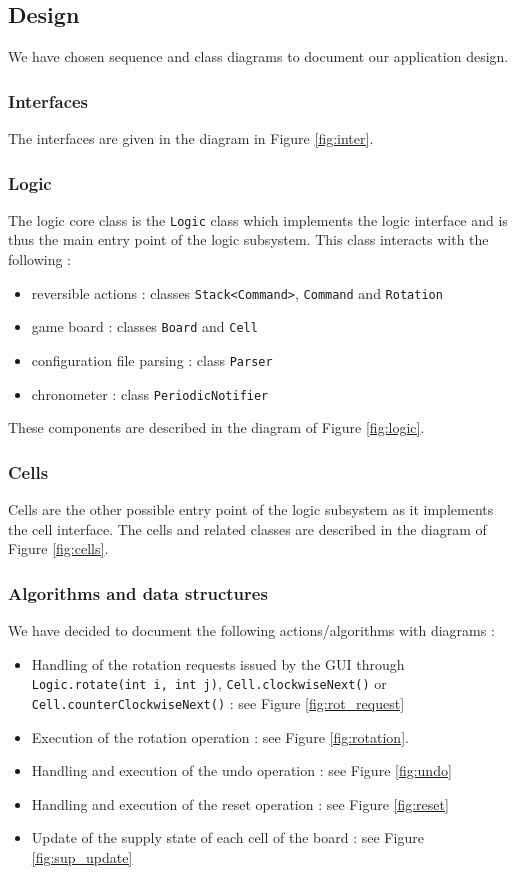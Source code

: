 \documentclass[a4paper,11pt]{article}
\begin{document}
\subsection{Design}
We have chosen sequence and class diagrams to document our application design. 
\subsubsection{Interfaces}
The interfaces are given in the diagram in Figure \ref{fig:inter}.
\subsubsection{Logic}
The logic core class is the \texttt{Logic} class which implements the logic interface and is thus the main entry point of the logic subsystem. This class interacts with the following :
\begin{itemize}
	\item reversible actions : classes \texttt{Stack<Command>}, \texttt{Command} and \texttt{Rotation} 
	\item game board : classes \texttt{Board} and \texttt{Cell}
	\item configuration file parsing : class \texttt{Parser}
	\item chronometer : class \texttt{PeriodicNotifier}
\end{itemize}
These components are described in the diagram of Figure \ref{fig:logic}.
\subsubsection{Cells}
Cells are the other possible entry point of the logic subsystem as it implements the cell interface. The cells and related classes are described in the diagram of Figure \ref{fig:cells}.
\subsubsection{Algorithms and data structures}
We have decided to document the following actions/algorithms with diagrams :
\begin{itemize}
	\item Handling of the rotation requests issued by the GUI through \texttt{Logic.rotate(int i, int j)}, \texttt{Cell.clockwiseNext()} or \texttt{Cell.counterClockwiseNext()} : see Figure \ref{fig:rot_request}
	\item Execution of the rotation operation : see Figure \ref{fig:rotation}.
	\item Handling and execution of the undo operation  : see Figure \ref{fig:undo}
	\item Handling and execution of the reset operation : see Figure \ref{fig:reset}
	\item Update of the supply state of each cell of the board : see Figure \ref{fig:sup_update}
\end{itemize}
\end{document}
